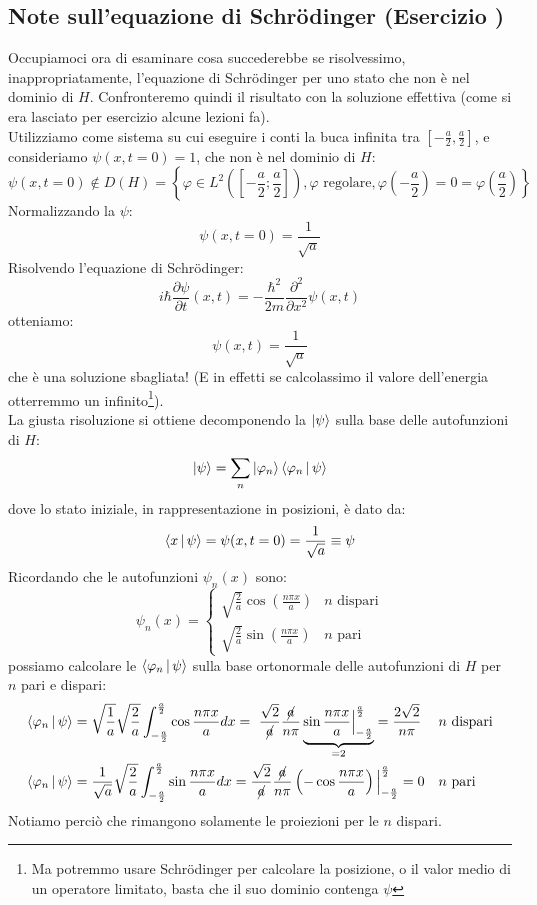 \documentclass[../../FisicaTeorica.tex]{subfiles}
\begin{document}
\subsection{Note sull'equazione di Schrödinger (Esercizio \theEsercizio)}
Occupiamoci ora di esaminare cosa succederebbe se risolvessimo, inappropriatamente, l'equazione di Schrödinger per uno stato che non è nel dominio di $H$. Confronteremo quindi il risultato con la soluzione effettiva (come si era lasciato per esercizio alcune lezioni fa).\\
Utilizziamo come sistema su cui eseguire i conti la buca infinita tra $[-\frac{a}{2},\frac{a}{2}]$, e consideriamo $\psi(x,t=0)=1$, che non è nel dominio di $H$:
\[
\psi(x,t=0)\notin D(H) = \left\{\varphi\in L^2\left(\left[-\frac{a}{2}; \frac{a}{2}\right]\right), \varphi \text{ regolare}, \varphi\left(-\frac{a}{2}\right)=0=\varphi\left(\frac{a}{2}\right)\right\}
\]
Normalizzando la $\psi$:
\[
\psi(x,t=0)=\frac{1}{\sqrt{a}}
\]
Risolvendo l'equazione di Schrödinger:
\[
i\hbar \frac{\partial \psi}{\partial t}(x,t) = -\frac{\hbar^2}{2m}\frac{\partial^2}{\partial x^2}\psi(x,t)
\]
otteniamo:
\[
\psi(x,t)=\frac{1}{\sqrt{a}}
\]
che è una soluzione sbagliata! (E in effetti se calcolassimo il valore dell'energia otterremmo un infinito\footnote{Ma potremmo usare Schrödinger per calcolare la posizione, o il valor medio di un operatore limitato, basta che il suo dominio contenga $\psi$}).\\
La giusta risoluzione si ottiene decomponendo la $\Ket{\psi}$ sulla base delle autofunzioni di $H$:
\[
\Ket{\psi}=\sum_n \Ket{\varphi_n}\Braket{\varphi_n|\psi}
\]
dove lo stato iniziale, in rappresentazione in posizioni, è dato da:
\[
\Braket{x|\psi}=\psi(x,t=0) = \frac{1}{\sqrt{a}} \equiv \psi
\]
Ricordando che le autofunzioni $\psi_n(x)$ sono:
\[
\psi_n(x) = \begin{cases}
\sqrt{\frac{2}{a}}\cos\left(\frac{n\pi x}{a}\right) & \text{$n$ dispari}\\
\sqrt{\frac{2}{a}}\sin\left(\frac{n\pi x}{a}\right) & \text{$n$ pari}
\end{cases}
\]
possiamo calcolare le  $\Braket{\varphi_n|\psi}$ sulla base ortonormale delle autofunzioni di $H$ per $n$ pari e dispari:
\begin{align*}
\Braket{\varphi_n|\psi}&=\sqrt{\frac{1}{a}}\sqrt{\frac{2}{a}}\int_{-\frac{a}{2}}^{\frac{a}{2}}\cos \frac{n\pi x}{a}dx =\ \frac{\sqrt{2}}{\cancel{a}} \frac{\cancel{a}}{n\pi}
\underbrace{\sin \frac{n\pi x}{a}\Big|_{-\frac{a}{2}}^{\frac{a}{2}}}_{=2}=\frac{2\sqrt{2}}{n\pi} && \text{$n$ dispari}\\
\Braket{\varphi_n|\psi}&=\frac{1}{\sqrt{a}}\sqrt{\frac{2}{a}}\int_{-\frac{a}{2}}^{\frac{a}{2}}\sin \frac{n\pi x}{a}dx = \frac{\sqrt{2}}{\cancel{a}}\frac{\cancel{a}}{n\pi}\left(-\cos\frac{n\pi x}{a}\right)\Big|_{-\frac{a}{2}}^{\frac{a}{2}}=0 &&\text{$n$ pari}
\end{align*}
Notiamo perciò che rimangono solamente le proiezioni per le $n$ dispari.\\
\end{document}
